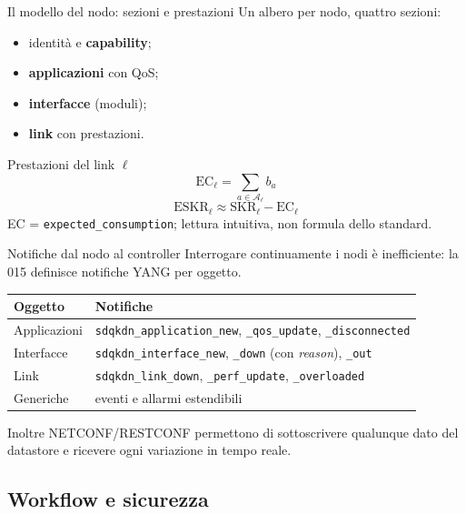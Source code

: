 \documentclass[10pt]{beamer}
\begin{document}
\begin{frame}{Il modello del nodo: sezioni e prestazioni}
      \small
      Un albero per nodo, quattro sezioni:
      \begin{itemize}
        \item identità e \textbf{capability};
        \item \textbf{applicazioni} con QoS;
        \item \textbf{interfacce} (moduli);
        \item \textbf{link} con prestazioni.
      \end{itemize}
      \begin{block}{Prestazioni del link $\ell$}
        \[
          \mathrm{EC}_\ell = \sum_{a\in\mathcal{A}_\ell} b_a
        \]
        \[
          \mathrm{ESKR}_\ell \approx \mathrm{SKR}_\ell - \mathrm{EC}_\ell
        \]
        {\footnotesize EC = \texttt{expected\_consumption}; lettura intuitiva,
        non formula dello standard.}
      \end{block}
\end{frame}

\begin{frame}{Notifiche dal nodo al controller}
  Interrogare continuamente i nodi è inefficiente: la 015 definisce
  notifiche YANG per oggetto.
  \vspace{1ex}
  \small
  \begin{tabularx}{\textwidth}{@{}l L@{}}
    \toprule
    \textbf{Oggetto} & \textbf{Notifiche} \\
    \midrule
    Applicazioni & \texttt{sdqkdn\_application\_new}, \texttt{\_qos\_update}, \texttt{\_disconnected} \\
    Interfacce & \texttt{sdqkdn\_interface\_new}, \texttt{\_down} (con \emph{reason}), \texttt{\_out} \\
    Link & \texttt{sdqkdn\_link\_down}, \texttt{\_perf\_update}, \texttt{\_overloaded} \\
    Generiche & eventi e allarmi estendibili \\
    \bottomrule
  \end{tabularx}
  \vspace{2ex}

  Inoltre NETCONF/RESTCONF permettono di sottoscrivere qualunque dato del
  datastore e ricevere ogni variazione in tempo reale.
\end{frame}

\subsection{Workflow e sicurezza}
\end{document}
